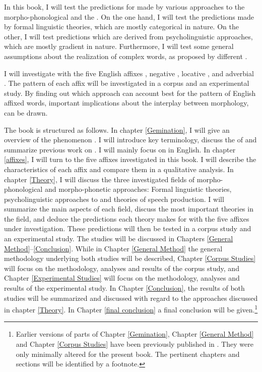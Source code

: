 In this book, I will test the predictions for  made by various approaches to the morpho-phonological and the . 
On the one hand, I will test the predictions made by formal linguistic theories, which are mostly categorical in nature. On the other, I will test predictions which are derived from psycholinguistic approaches, which are mostly gradient in nature. Furthermore, I will test some general assumptions about the realization of complex words, as proposed by different .

I will investigate  with the five English affixes , negative , locative ,  and adverbial . The  pattern of each affix will be investigated in a corpus and an experimental study. 
By finding out which approach can account best for the  pattern of English affixed words, important implications about the interplay between morphology,  can be drawn.



The book is structured as follows.
 In chapter \ref{Gemination}, I will give an overview of the phenomenon . I will introduce key terminology, discuss the  of  and summarize previous work on . I will mainly focus on  in English. 
 In chapter \ref{affixes}, I will turn to the five affixes investigated in this book. I will describe the characteristics of each affix and compare them in a qualitative analysis. 
  In  chapter \ref{Theory}, I will discuss the three investigated fields of morpho-phonological and morpho-phonetic approaches: Formal linguistic theories, psycholinguistic approaches to  and theories of speech production. I will summarize the main aspects of each field, discuss the most important theories in the field, and deduce the predictions each theory makes for  with the five affixes under investigation. 
  These predictions will then be tested in a corpus study and an experimental study. The studies will be discussed in Chapters \ref{General Method}--\ref{Conclusion}.
   While in Chapter \ref{General Method} the general methodology underlying both studies will be described, 
  Chapter \ref{Corpus Studies} will focus on the methodology, analyses and results of the corpus study, and 
  Chapter \ref{Experimental Studies} will focus on the methodology, analyses and results of the experimental study.
   In Chapter \ref{Conclusion}, the results of both studies will be summarized and discussed with regard to the approaches discussed in chapter \ref{Theory}.
  In Chapter \ref{final conclusion} a final conclusion will be given.\footnote{Earlier versions of parts of Chapter \ref{Gemination}, Chapter \ref{General Method} and Chapter \ref{Corpus Studies} have been previously published in \cite{BenHedia.2017}. They were only minimally altered for the present book. The pertinent chapters and sections will be identified by a footnote.}




